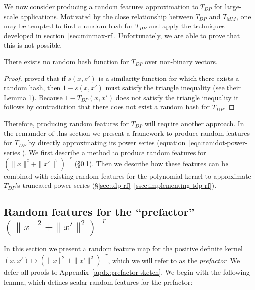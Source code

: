 We now consider producing a random features approximation to $T_{DP}$ for large-scale applications.
Motivated by the close relationship between $T_{DP}$ and $T_{MM}$,
one may be tempted to find a random hash for $T_{DP}$
and apply the techniques developed in section~\ref{sec:minmax-rf}.
Unfortunately, we are able to prove that this is not possible.
\begin{proposition}\label{no random hash for tdp}
    There exists no random hash function for $T_{DP}$ over non-binary vectors.
\end{proposition}
\begin{proof}
    \citet{charikar2002similarity} proved that if $s(x,x')$ is a similarity function
    for which there exists a random hash,
    then $1-s(x,x')$ must satisfy the triangle inequality (see their Lemma 1).
    Because $1-T_{DP}(x,x')$ does not satisfy the triangle inequality it follows by contradiction
    that there does not exist a random hash for $T_{DP}$.
\end{proof}

Therefore, producing random features for $T_{DP}$ will require another approach.
In the remainder of this section we present a framework to produce random features for $T_{DP}$ by directly approximating its power series
(equation~\ref{eqn:tanidot-power-series}).
We first describe a method to produce random features for $(\|x\|^2+\|x'\|^2)^{-r}$ (\S\ref{ssec:prefactor-rf}).
Then we describe how these features can be combined with existing random features for the polynomial kernel
to approximate $T_{DP}$'s truncated power series (\S\ref{sec:tdp-rf}--\ref{ssec:implementing tdp rf}).



\subsection{Random features for the ``prefactor'' \texorpdfstring{$\left(\|x\|^2+\|x'\|^2\right)^{-r}$}{}}\label{ssec:prefactor-rf}

In this section we present a random feature map for the positive definite kernel $\textstyle (x,x')\mapsto (\|x\|^2 + \|x'\|^2)^{-r}$,
which we will refer to as the \emph{prefactor}.
We defer all proofs to Appendix~\ref{apdx:prefactor-sketch}.
We begin with the following lemma, which defines scalar random features for the prefactor:

